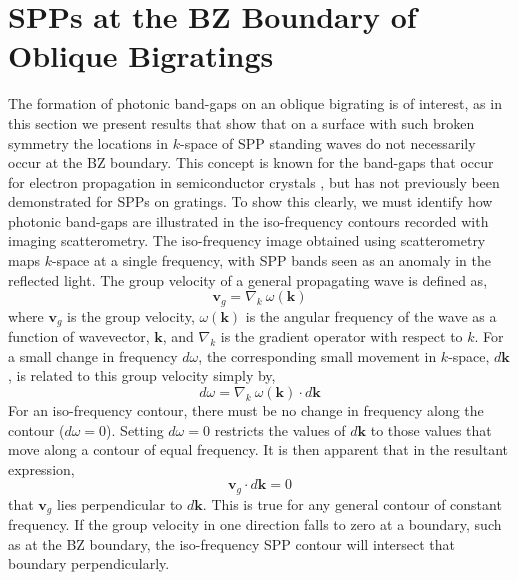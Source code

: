 \section{SPPs at the BZ Boundary of Oblique Bigratings\label{s:ob-BZ}}
The formation of photonic band-gaps on an oblique bigrating is of interest, as in this section we present results that show that on a surface with such broken symmetry the locations in $k$-space of SPP standing waves do not necessarily occur at the BZ boundary. This concept is known for the band-gaps that occur for electron propagation in semiconductor crystals \cite{Iva}, but has not previously been demonstrated for SPPs on gratings. To show this clearly, we must identify how photonic band-gaps are illustrated in the iso-frequency contours recorded with imaging scatterometry.
The iso-frequency image obtained using scatterometry maps $k$-space at a single frequency, with SPP bands seen as an anomaly in the reflected light. 
The group velocity of a general propagating wave is defined as,
\begin{equation}
\mathbf{v}_g = \nabla_k\: \omega(\mathbf{k})
\end{equation}
where $\mathbf{v}_g$ is the group velocity, $\omega(\mathbf{k})$ is the angular frequency of the wave as a function of wavevector, $\mathbf{k}$, and $\nabla_k$ is the gradient operator with respect to $k$. For a small change in frequency $d\omega$, the corresponding small movement in $k$-space, $d\mathbf{k}$, is related to this group velocity simply by,
\begin{equation}
d\omega = \nabla_k\: \omega(\mathbf{k}) \cdot d\mathbf{k}
\end{equation}
For an iso-frequency contour, there must be no change in frequency along the contour ($d\omega=0$). Setting $d\omega=0$ restricts the values of $d\mathbf{k}$ to those values that move along a contour of equal frequency. It is then apparent that in the resultant expression,
\begin{equation}
\mathbf{v}_g \cdot d\mathbf{k} = 0
\end{equation}
that $\mathbf{v}_g$ lies perpendicular to $d\mathbf{k}$.
This is true for any general contour of constant frequency. If the group velocity in one direction falls to zero at a boundary, such as at the BZ boundary,  the iso-frequency SPP contour will intersect that boundary perpendicularly.

